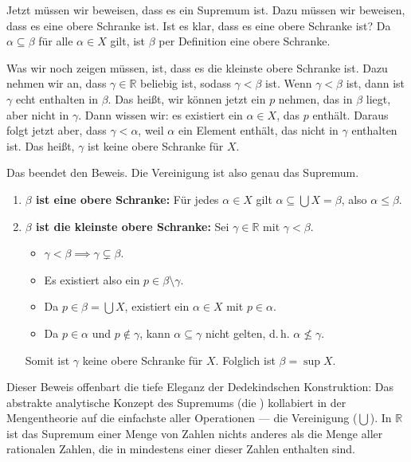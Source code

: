 \begin{spoken-clean}[01:18:15 - 01:21:00]
Jetzt müssen wir beweisen, dass es ein Supremum ist. Dazu müssen wir beweisen, dass es eine obere Schranke ist. Ist es klar, dass es eine obere Schranke ist? Da $\alpha \subseteq \beta$ für alle $\alpha \in X$ gilt, ist $\beta$ per Definition eine obere Schranke.

Was wir noch zeigen müssen, ist, dass es die kleinste obere Schranke ist. Dazu nehmen wir an, dass $\gamma \in \mathbb{R}$ beliebig ist, sodass $\gamma < \beta$ ist. Wenn $\gamma < \beta$ ist, dann ist $\gamma$ echt enthalten in $\beta$. Das heißt, wir können jetzt ein $p$ nehmen, das in $\beta$ liegt, aber nicht in $\gamma$. Dann wissen wir: es existiert ein $\alpha \in X$, das $p$ enthält. Daraus folgt jetzt aber, dass $\gamma < \alpha$, weil $\alpha$ ein Element enthält, das nicht in $\gamma$ enthalten ist. Das heißt, $\gamma$ ist keine obere Schranke für $X$.

Das beendet den Beweis. Die Vereinigung ist also genau das Supremum.
\end{spoken-clean}

\begin{math-stroke}
 \begin{enumerate}[label=\textbf{(\arabic*)}] 
    \item \textbf{$\beta$ ist eine obere Schranke:} Für jedes $\alpha \in X$ gilt $\alpha \subseteq \bigcup X = \beta$, also $\alpha \le \beta$.
    \item \textbf{$\beta$ ist die kleinste obere Schranke:} Sei $\gamma \in \mathbb{R}$ mit $\gamma < \beta$.
    \begin{itemize}
        \item $\gamma < \beta \implies \gamma \subsetneq \beta$.
        \item Es existiert also ein $p \in \beta \setminus \gamma$.
        \item Da $p \in \beta = \bigcup X$, existiert ein $\alpha \in X$ mit $p \in \alpha$.
        \item Da $p \in \alpha$ und $p \notin \gamma$, kann $\alpha \subseteq \gamma$ nicht gelten, d.\,h. $\alpha \not\le \gamma$.
    \end{itemize}
    Somit ist $\gamma$ keine obere Schranke für $X$. Folglich ist $\beta = \sup X$.
\end{enumerate}
\end{math-stroke}

\begin{didactic-insight}
Dieser Beweis offenbart die tiefe Eleganz der Dedekindschen Konstruktion: Das abstrakte analytische Konzept des Supremums (die ) kollabiert in der Mengentheorie auf die einfachste aller Operationen --- die Vereinigung ($\bigcup$). In $\mathbb{R}$ ist das Supremum einer Menge von Zahlen nichts anderes als die Menge aller rationalen Zahlen, die in mindestens einer dieser Zahlen enthalten sind.
\end{didactic-insight}

